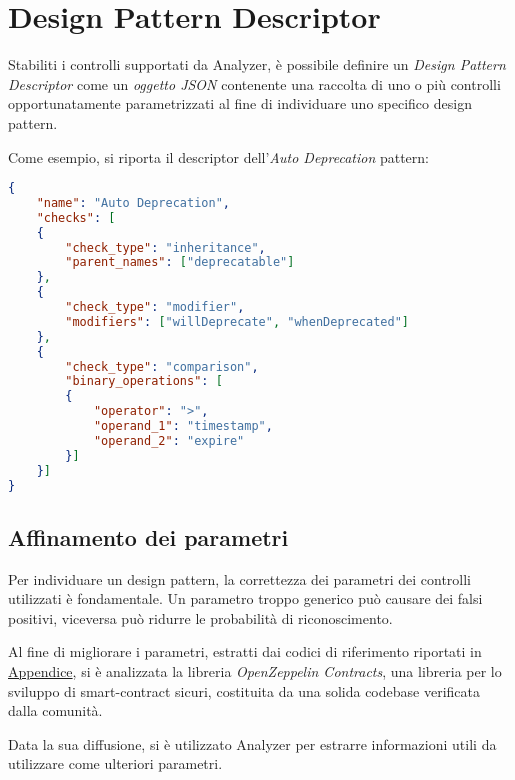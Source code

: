 \section{Design Pattern Descriptor}
Stabiliti i controlli supportati da Analyzer, è possibile definire un \textit{Design Pattern Descriptor} come un \textit{oggetto JSON} contenente una raccolta di uno o più controlli opportunatamente parametrizzati al fine di individuare uno specifico design pattern.\par
Come esempio, si riporta il descriptor dell'\textit{Auto Deprecation} pattern:
	{\begin{lstlisting}[language=json, caption={Auto Deprecation Descriptor}, label={descriptor:auto_deprecation}]
{
	"name": "Auto Deprecation",
	"checks": [
	{
		"check_type": "inheritance",
		"parent_names": ["deprecatable"]
	},
	{
		"check_type": "modifier",
		"modifiers": ["willDeprecate", "whenDeprecated"]
	},
	{
		"check_type": "comparison",
		"binary_operations": [
		{
			"operator": ">",
			"operand_1": "timestamp",
			"operand_2": "expire"
		}]
	}]
}\end{lstlisting}}
\subsection{Affinamento dei parametri}
Per individuare un design pattern, la correttezza dei parametri dei controlli utilizzati è fondamentale. Un parametro troppo generico può causare dei falsi positivi, viceversa può ridurre le probabilità di riconoscimento.\par
Al fine di migliorare i parametri, estratti dai codici di riferimento riportati in \hyperref[appendix:codici]{Appendice}, si è analizzata la libreria \textit{OpenZeppelin Contracts}\cite{openzeppelin}, una libreria per lo sviluppo di smart-contract sicuri, costituita da una solida codebase verificata dalla comunità.\par Data la sua diffusione, si è utilizzato Analyzer per estrarre informazioni utili da utilizzare come ulteriori parametri.

